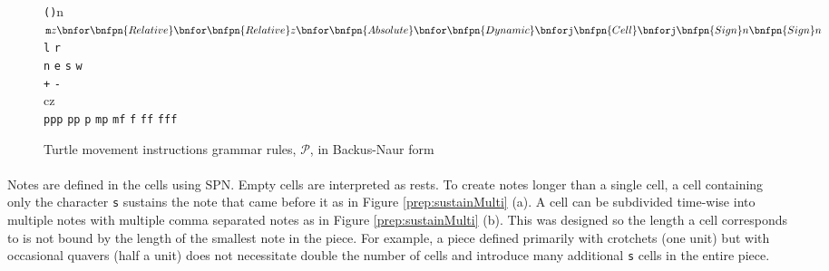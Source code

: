 \newenvironment{bnfsplit}[1][0.7\textwidth]
 {\minipage[t]{#1}$}
 {$\endminipage}

\begin{figure}[ht]
\renewcommand{\models}{::=}
\begin{bnf*}
  {
   }\\
    {
    \bnfor {}
     }\\
   {
   \texttt{(}\texttt{)}n
   \bnfor {}
    }\\
    {
    \begin{bnfsplit}
    \texttt{m}z
    \bnfor \bnfpn{Relative}
    \bnfor \bnfpn{Relative}z
    \bnfor \bnfpn{Absolute}
    \bnfor \bnfpn{Dynamic}
    \\ \bnfor \texttt{j}\bnfpn{Cell}
    \bnfor \texttt{j}\bnfpn{Sign}n\bnfpn{Sign}n
    \end{bnfsplit}
     }\\
     {
     \texttt{l}
     \bnfor \texttt{r}
      }\\
    {
    \texttt{n}
    \bnfor \texttt{e}
    \bnfor \texttt{s}
    \bnfor \texttt{w}
     }\\
   {
   \texttt{+}
   \bnfor \texttt{-}
    }\\
    {
    cz
     }\\
   {
   \texttt{ppp}
   \bnfor \texttt{pp}
   \bnfor \texttt{p}
   \bnfor \texttt{mp}
   \bnfor \texttt{mf}
   \bnfor \texttt{f}
   \bnfor \texttt{ff}
   \bnfor \texttt{fff}
    }\\
\end{bnf*}
\vspace{-35pt}
\caption{Turtle movement instructions grammar rules, $\mathcal{P}$, in Backus-Naur form~\cite{bnf}}
\label{fig:grammar}
\end{figure}

\paragraph{} Notes are defined in the cells using SPN. Empty cells are interpreted as rests. To create notes longer than a single cell, a cell containing only the character \texttt{s} sustains the note that came before it as in Figure \ref{prep:sustainMulti} (a). A cell can be subdivided time-wise into multiple notes with multiple comma separated notes as in Figure \ref{prep:sustainMulti} (b). This was designed so the length a cell corresponds to is not bound by the length of the smallest note in the piece. For example, a piece defined primarily with crotchets (one unit) but with occasional quavers (half a unit) does not necessitate double the number of cells and introduce many additional \texttt{s} cells in the entire piece.


